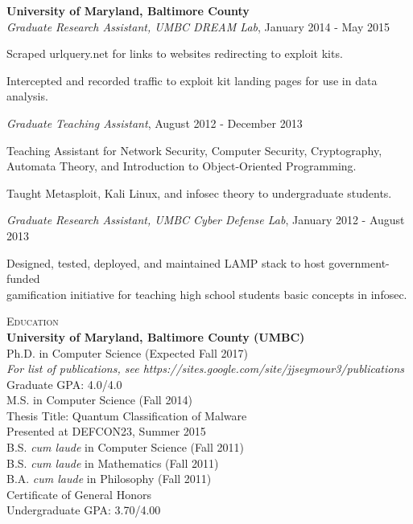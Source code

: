 \medskip
\atab \textbf{University of Maryland, Baltimore County}\\
\btab \textit{Graduate Research Assistant, UMBC DREAM Lab}, January 2014 - May 2015\\
\begin{my_list}
\item Scraped urlquery.net for links to websites redirecting to exploit kits.
\item Intercepted and recorded traffic to exploit kit landing pages for use in data analysis.
\end{my_list}

\btab \textit{Graduate Teaching Assistant}, August 2012 - December 2013\\
\begin{my_list}
\item Teaching Assistant for Network Security, Computer Security, Cryptography,\\ \tab \tab Automata Theory, and Introduction to Object-Oriented Programming.
\item Taught Metasploit, Kali Linux, and infosec theory to undergraduate students.
\end{my_list}

\btab \textit{Graduate Research Assistant, UMBC Cyber Defense Lab}, January 2012 - August 2013\\
\begin{my_list}
\item Designed, tested, deployed, and maintained LAMP stack to host government-funded\\ \tab \tab gamification initiative for teaching high school students basic concepts in infosec.
\end{my_list}

\medskip
\textsc{Education}\\
\atab \textbf{University of Maryland, Baltimore County (UMBC)}\\
\btab Ph.D. in Computer Science (Expected Fall 2017)\\
\ctab \emph{For list of publications, see https://sites.google.com/site/jjseymour3/publications}\\
\ctab Graduate GPA: 4.0/4.0\\
\btab M.S. in Computer Science (Fall 2014)\\
\ctab Thesis Title: Quantum Classification of Malware\\
\ctab Presented at DEFCON23, Summer 2015\\
\btab B.S. \emph{cum laude} in Computer Science (Fall 2011)\\
\btab B.S. \emph{cum laude} in Mathematics (Fall 2011) \\
\btab B.A. \emph{cum laude} in Philosophy (Fall 2011)\\
\btab Certificate of General Honors\\
\ctab Undergraduate GPA: 3.70/4.00\\

